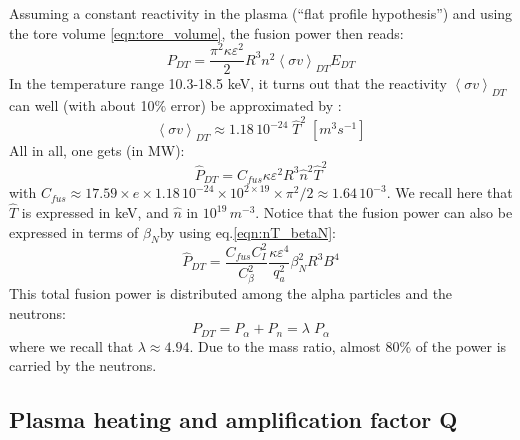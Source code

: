 Assuming a constant reactivity in the plasma (``flat profile hypothesis'') and using the tore volume \ref{eqn:tore_volume}, the fusion power then reads:
\begin{equation*}
  P_{DT} = \frac{\pi^2 \kappa \varepsilon^2}{2} 
  R^3 n^2 \left< \sigma v \right>_{DT} E_{DT}
\end{equation*}
In the temperature range 10.3-18.5 keV, it turns out that the reactivity $\left< \sigma v \right>_{DT}$ can well (with about 10$\%$ error) be approximated by \cite[(1.5.4)]{Wesson2004}: 
\begin{equation*}
  \left< \sigma v \right>_{DT} \approx 1.18\, 10^{-24}\; \hat T^2 \;\si{\left[m^3 s^{-1}\right]}
\end{equation*}
All in all, one gets (in MW):
\begin{equation}
  \hat P_{DT} = C_{fus} \kappa \varepsilon^2 R^3 \hat n^2 \hat T^2  
\label{eq:DT_fusion_power}
\end{equation}
with $C_{fus} \approx 17.59 \times e\times 1.18\, 10^{-24} \times 10^{2\times19}\times \pi^2/2 \approx 1.64\, 10^{-3}$. We recall here that $\hat T$ is expressed in keV, and $\hat n$ in $10^{19} \, \si{m^{-3}}$. 
Notice that the fusion power can also be expressed in terms of $\beta_N$by using eq.\ref{eqn:nT_betaN}:
\begin{equation}
  \hat P_{DT} = \frac{C_{fus}C_I^2}{C_\beta^2} \frac{\kappa \varepsilon^4}{q_a^2} 
    \beta_N^2 R^3 B^4 
\label{eq:DT_fusion_power_betaN}
\end{equation}
This total fusion power is distributed among the alpha particles and the neutrons: 
\begin{equation*}
  P_{DT} = P_\alpha + P_n = \lambda \; P_\alpha
\end{equation*}
where we recall that $\lambda \approx 4.94$. Due to the mass ratio, almost 80\% of the power is carried by the neutrons. 

\subsection{Plasma heating and amplification factor Q}

